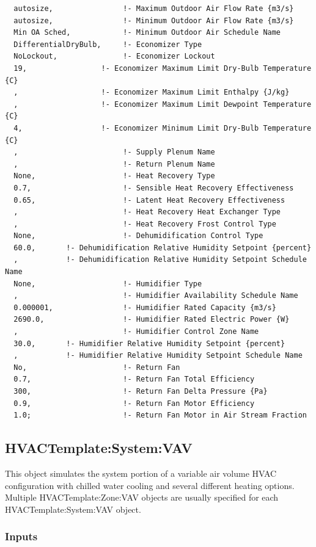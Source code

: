 \begin{lstlisting}
  autosize,                !- Maximum Outdoor Air Flow Rate {m3/s}
  autosize,                !- Minimum Outdoor Air Flow Rate {m3/s}
  Min OA Sched,            !- Minimum Outdoor Air Schedule Name
  DifferentialDryBulb,     !- Economizer Type
  NoLockout,               !- Economizer Lockout
  19,                 !- Economizer Maximum Limit Dry-Bulb Temperature {C}
  ,                   !- Economizer Maximum Limit Enthalpy {J/kg}
  ,                   !- Economizer Maximum Limit Dewpoint Temperature {C}
  4,                  !- Economizer Minimum Limit Dry-Bulb Temperature {C}
  ,                        !- Supply Plenum Name
  ,                        !- Return Plenum Name
  None,                    !- Heat Recovery Type
  0.7,                     !- Sensible Heat Recovery Effectiveness
  0.65,                    !- Latent Heat Recovery Effectiveness
  ,                        !- Heat Recovery Heat Exchanger Type
  ,                        !- Heat Recovery Frost Control Type
  None,                    !- Dehumidification Control Type
  60.0,       !- Dehumidification Relative Humidity Setpoint {percent}
  ,           !- Dehumidification Relative Humidity Setpoint Schedule Name
  None,                    !- Humidifier Type
  ,                        !- Humidifier Availability Schedule Name
  0.000001,                !- Humidifier Rated Capacity {m3/s}
  2690.0,                  !- Humidifier Rated Electric Power {W}
  ,                        !- Humidifier Control Zone Name
  30.0,       !- Humidifier Relative Humidity Setpoint {percent}
  ,           !- Humidifier Relative Humidity Setpoint Schedule Name
  No,                      !- Return Fan
  0.7,                     !- Return Fan Total Efficiency
  300,                     !- Return Fan Delta Pressure {Pa}
  0.9,                     !- Return Fan Motor Efficiency
  1.0;                     !- Return Fan Motor in Air Stream Fraction
\end{lstlisting}

\subsection{HVACTemplate:System:VAV}\label{hvactemplatesystemvav}

This object simulates the system portion of a variable air volume HVAC configuration with chilled water cooling and several different heating options. Multiple HVACTemplate:Zone:VAV objects are usually specified for each HVACTemplate:System:VAV object.

\subsubsection{Inputs}\label{inputs-18-002}

